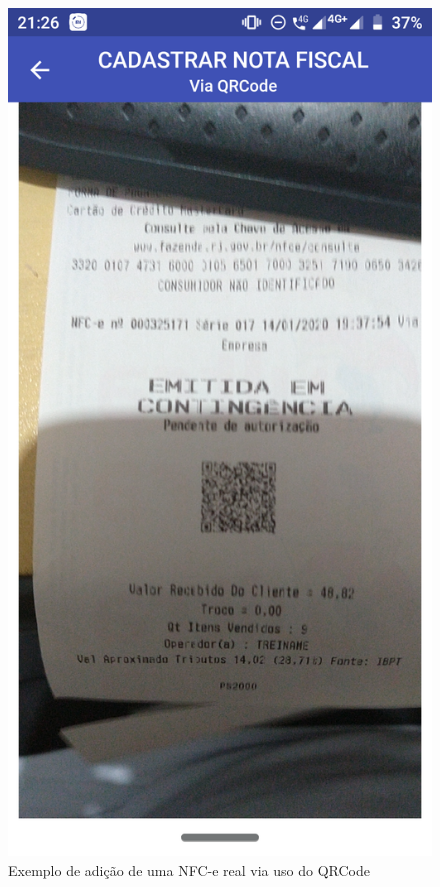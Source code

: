 \begin{figure}[h]
    \centering
    \includegraphics[scale=0.15]{tcc/figures/app/app_codigo_qrcode_solicitacao.png}
    \caption{Exemplo de adição de uma NFC-e real via uso do QRCode}
    \label{appQRCodeSolicitacaoFig}
\end{figure}

